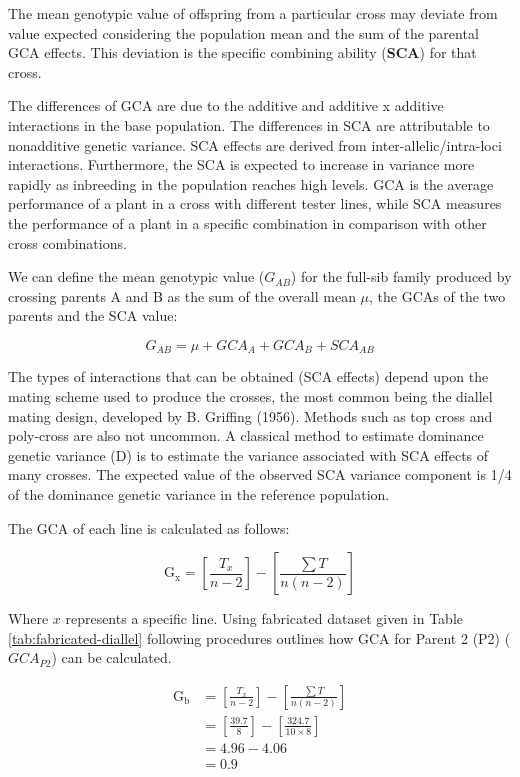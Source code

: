 \documentclass[nofonts,]{tufte-handout}
\begin{document}
The mean genotypic value of offspring from a particular cross may
deviate from value expected considering the population mean and the sum
of the parental GCA effects. This deviation is the specific combining
ability (\textbf{SCA}) for that cross.

The differences of GCA are due to the additive and additive x additive
interactions in the base population. The differences in SCA are
attributable to nonadditive genetic variance. SCA effects are derived
from inter-allelic/intra-loci interactions. Furthermore, the SCA is
expected to increase in variance more rapidly as inbreeding in the
population reaches high levels. GCA is the average performance of a
plant in a cross with different tester lines, while SCA measures the
performance of a plant in a specific combination in comparison with
other cross combinations.

We can define the mean genotypic value (\(G_{AB}\)) for the full-sib
family produced by crossing parents A and B as the sum of the overall
mean \(\mu\), the GCAs of the two parents and the SCA value:

\[G_{AB} = \mu + GCA_A + GCA_B + SCA_{AB}\]

The types of interactions that can be obtained (SCA effects) depend upon
the mating scheme used to produce the crosses, the most common being the
diallel mating design, developed by B. Griffing (1956). Methods such as
top cross and poly-cross are also not uncommon. A classical method to
estimate dominance genetic variance (D) is to estimate the variance
associated with SCA effects of many crosses. The expected value of the
observed SCA variance component is 1/4 of the dominance genetic variance
in the reference population.

The GCA of each line is calculated as follows:

\[
\mathrm{G_x} = \left[\frac{T_x}{n-2}\right]-\left[\frac{\sum T}{n(n-2)}\right]
\]

Where \(x\) represents a specific line. Using fabricated dataset given
in Table \ref{tab:fabricated-diallel} following procedures outlines how
GCA for Parent 2 (P2) (\(GCA_{P2}\)) can be calculated.

\begin{equation}
\begin{split}
\mathrm{G_b} & = \left[\frac{T_x}{n-2}\right]-\left[\frac{\sum T}{n(n-2)}\right] \\
 & = \left[\frac{39.7}{8}\right]-\left[\frac{324.7}{10\times 8}\right] \\
 & = 4.96-4.06 \\
 & = 0.9
\end{split}
\end{equation}
\end{document}
